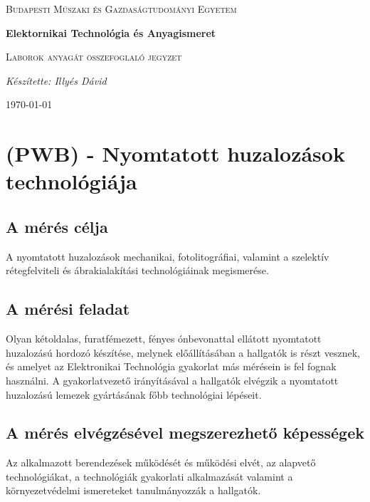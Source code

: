 \documentclass[12pt]{article}
\begin{document}
\begin{titlepage}
	\centering \vfill
	{\textsc{Budapesti Műszaki és Gazdaságtudományi Egyetem} \par} \vspace{7cm}
	{\huge\bfseries Elektornikai Technológia és Anyagismeret\par} \vspace{0.5cm}
	{\large \textsc{Laborok anyagát összefoglaló jegyzet}\par} \vspace{1.5cm}
	{\Large\itshape Készítette: Illyés Dávid\par} \vfill

	\noindent{}
	
	\vfill {\large \today\par}
\end{titlepage} 
\tableofcontents
{}

	\section{(PWB) - Nyomtatott huzalozások technológiája}
	\subsection{A mérés célja} A nyomtatott huzalozások mechanikai, fotolitográfiai, valamint a szelektív rétegfelviteli és ábrakialakítási technológiáinak megismerése.

		\subsection{A mérési feladat} Olyan kétoldalas, furatfémezett, fényes ónbevonattal ellátott nyomtatott	huzalozású hordozó készítése, melynek előállításában a hallgatók is részt vesznek, és amelyet az Elektronikai Technológia gyakorlat más mérésein is fel fognak használni. A gyakorlatvezető irányításával a hallgatók elvégzik a nyomtatott huzalozású lemezek gyártásának főbb technológiai lépéseit.

		\subsection{A mérés elvégzésével megszerezhető képességek} Az alkalmazott berendezések működését és működési elvét, az alapvető technológiákat, a technológiák gyakorlati alkalmazását valamint a környezetvédelmi ismereteket tanulmányozzák a hallgatók.
		
\end{document}
